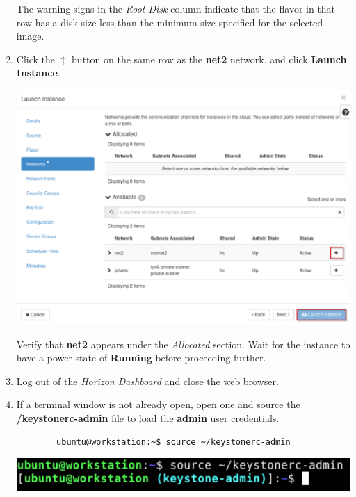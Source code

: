 \documentclass[letterpaper, 12pt]{article}
\begin{document}
\begin{enumerate}
    \begin{notebox}
        The warning signs in the \textit{Root Disk} column indicate that the flavor in that row has a disk size less than the minimum size specified for the selected image.
    \end{notebox}

    \item Click the $\uparrow$ button on the same row as the \textbf{net2} network, and click \textbf{Launch Instance}.

    \begin{center}
        \includegraphics[width=\linewidth]{images/part4/step6.png}
    \end{center}

    \begin{stopbox}
        Verify that \textbf{net2} appears under the \textit{Allocated} section.
        Wait for the instance to have a power state of \textbf{Running} before proceeding further.
    \end{stopbox}

    \item Log out of the \textit{Horizon Dashboard} and close the web browser.

    \item If a terminal window is not already open, open one and source the \textbf{\texttildemid/keystonerc-admin} file to load the \textbf{admin} user credentials.
    \begin{lstlisting}
        ubuntu@workstation:~$ source ~/keystonerc-admin
    \end{lstlisting}

    \begin{center}
        \includegraphics[width=\linewidth]{images/part4/step8.png}
    \end{center}


\end{enumerate}
\end{document}
